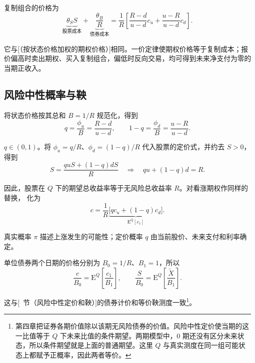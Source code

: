 复制组合的价格为
\[
 \underbrace{\theta_SS}_{\text{股票成本}}+
 \underbrace{\frac{\theta_B}{R}}_{\text{债券成本}}
 =\frac1R\left[\frac{R-d}{u-d}c_u+\frac{u-R}{u-d}c_d\right].
\]

它与[（按状态价格加权的期权价格）]相同。一价定律使期权价格等于复制成本；报价偏高时卖出期权、买入复制组合，偏低时反向交易，均可得到未来净支付为零的当期正收入。

\subsection{风险中性概率与鞅}
\begin{tcolorbox}[knowledge,title=二叉树的风险中性概率与定价]
将状态价格按其总和 $B=1/R$ 规范化，得到
\begin{equation}
 q=\frac{\phi_u}{B}=\frac{R-d}{u-d},\qquad
 1-q=\frac{\phi_d}{B}=\frac{u-R}{u-d}.
 \label{eq:wj-five-q}
\end{equation}

$q\in(0,1)$。将 $\phi_u=q/R$、$\phi_d=(1-q)/R$ 代入股票的定价式，并约去 $S>0$，得到
\[
 S=\frac{quS+(1-q)dS}{R}
 \quad\Longrightarrow\quad qu+(1-q)d=R.
\]

因此，股票在 $Q$ 下的期望总收益率等于无风险总收益率 $R$。对看涨期权作同样的替换， 化为
\[
 c=\frac1R\underbrace{\bigl[qc_u+(1-q)c_d\bigr]}_{\mathrm E^Q[c_1]}.
\]

真实概率 $\pi$ 描述上涨发生的可能性；定价概率 $q$ 由当前股价、未来支付和利率确定。
\end{tcolorbox}

单位债券两个日期的价格分别为 $B_0=1/R$、$B_1=1$，所以
\[
 \frac c{B_0}=\mathrm E^Q\!\left[\frac{c_1}{B_1}\right],\qquad
 \frac S{B_0}=\mathrm E^Q\!\left[\frac{\tilde X}{B_1}\right].
\]

这与[~节（风险中性定价和鞅）]的债券计价和等价鞅测度一致\footnote{第四章把证券各期价值除以该期无风险债券的价值。风险中性定价使当期的这一比值等于 $Q$ 下未来比值的条件期望。两期模型中，$0$ 期还没有区分未来状态，所以条件期望就是上面的普通期望。这里 $Q$ 与真实测度在同一组可能状态上都赋予正概率，因此两者等价。}。

